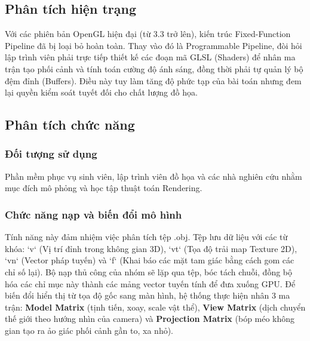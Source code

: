 \documentclass[13pt, a4paper]{extarticle}
\begin{document}
\subsection{Phân tích hiện trạng}
Với các phiên bản OpenGL hiện đại (từ 3.3 trở lên), kiến trúc Fixed-Function Pipeline đã bị loại bỏ hoàn toàn. Thay vào đó là Programmable Pipeline, đòi hỏi lập trình viên phải trực tiếp thiết kế các đoạn mã GLSL (Shaders) để nhân ma trận tạo phối cảnh và tính toán cường độ ánh sáng, đồng thời phải tự quản lý bộ đệm đỉnh (Buffers). Điều này tuy làm tăng độ phức tạp của bài toán nhưng đem lại quyền kiểm soát tuyết đối cho chất lượng đồ họa.

\subsection{Phân tích chức năng}
\subsubsection{Đối tượng sử dụng}
Phần mềm phục vụ sinh viên, lập trình viên đồ họa và các nhà nghiên cứu nhằm mục đích mô phỏng và học tập thuật toán Rendering.

\subsubsection{Chức năng nạp và biến đổi mô hình}
Tính năng này đảm nhiệm việc phân tích tệp .obj. Tệp lưu dữ liệu với các từ khóa: `v` (Vị trí đỉnh trong không gian 3D), `vt` (Tọa độ trải map Texture 2D), `vn` (Vector pháp tuyến) và `f` (Khai báo các mặt tam giác bằng cách gom các chỉ số lại). Bộ nạp thủ công của nhóm sẽ lặp qua tệp, bóc tách chuỗi, đồng bộ hóa các chỉ mục này thành các mảng vector tuyến tính để đưa xuống GPU.
Để biến đổi hiển thị từ tọa độ gốc sang màn hình, hệ thống thực hiện nhân 3 ma trận: \textbf{Model Matrix} (tịnh tiến, xoay, scale vật thể), \textbf{View Matrix} (dịch chuyển thế giới theo hướng nhìn của camera) và \textbf{Projection Matrix} (bóp méo không gian tạo ra ảo giác phối cảnh gần to, xa nhỏ).
\end{document}
